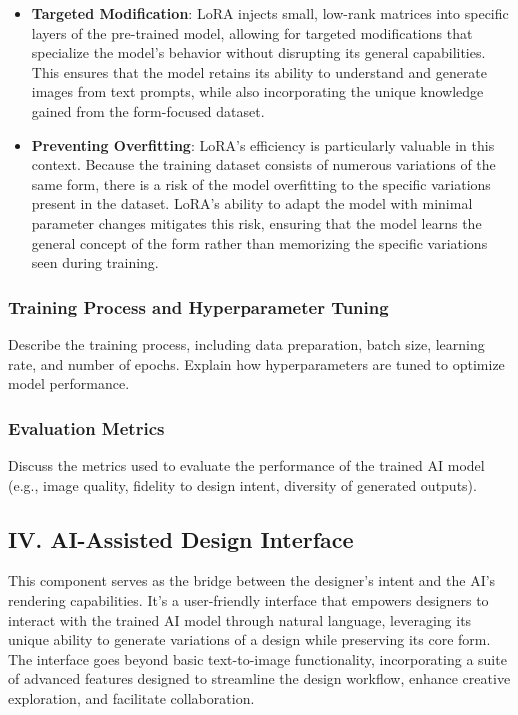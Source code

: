 \begin{itemize}
    \item \textbf{Targeted Modification}: LoRA injects small, low-rank matrices into specific layers of the pre-trained model, allowing for targeted modifications that specialize the model's behavior without disrupting its general capabilities. This ensures that the model retains its ability to understand and generate images from text prompts, while also incorporating the unique knowledge gained from the form-focused dataset.
    \item \textbf{Preventing Overfitting}: LoRA's efficiency is particularly valuable in this context. Because the training dataset consists of numerous variations of the same form, there is a risk of the model overfitting to the specific variations present in the dataset. LoRA's ability to adapt the model with minimal parameter changes mitigates this risk, ensuring that the model learns the general concept of the form rather than memorizing the specific variations seen during training.
\end{itemize}

\subsubsection{Training Process and Hyperparameter Tuning}
Describe the training process, including data preparation, batch size, learning rate, and number of epochs. Explain how hyperparameters are tuned to optimize model performance.

\subsubsection{Evaluation Metrics}
Discuss the metrics used to evaluate the performance of the trained AI model (e.g., image quality, fidelity to design intent, diversity of generated outputs).

\subsection{IV. AI-Assisted Design Interface}

This component serves as the bridge between the designer's intent and the AI's rendering capabilities. It's a user-friendly interface that empowers designers to interact with the trained AI model through natural language, leveraging its unique ability to generate variations of a design while preserving its core form. The interface goes beyond basic text-to-image functionality, incorporating a suite of advanced features designed to streamline the design workflow, enhance creative exploration, and facilitate collaboration.

